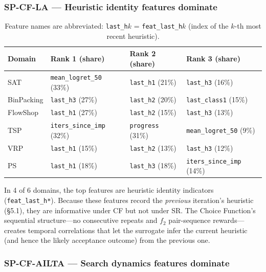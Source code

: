 \documentclass[11pt,a4paper]{article}
\begin{document}
\subsubsection*{SP-CF-LA --- Heuristic identity features dominate}

\begin{table}[H]
\centering
\small
\begin{tabular}{llll}
\toprule
Domain & Rank 1 (share) & Rank 2 (share) & Rank 3 (share) \\
\midrule
SAT & \texttt{mean\_logret\_50} (33\%) & \texttt{last\_h1} (21\%) & \texttt{last\_h3} (16\%) \\
BinPacking & \texttt{last\_h3} (27\%) & \texttt{last\_h2} (20\%) & \texttt{last\_class1} (15\%) \\
FlowShop & \texttt{last\_h1} (27\%) & \texttt{last\_h2} (15\%) & \texttt{last\_h3} (13\%) \\
TSP & \texttt{iters\_since\_imp} (32\%) & \texttt{progress} (31\%) & \texttt{mean\_logret\_50} (9\%) \\
VRP & \texttt{last\_h1} (15\%) & \texttt{last\_h2} (13\%) & \texttt{last\_h3} (12\%) \\
PS & \texttt{last\_h1} (18\%) & \texttt{last\_h3} (18\%) & \texttt{iters\_since\_imp} (14\%) \\
\bottomrule
\end{tabular}
\caption*{Feature names are abbreviated: \texttt{last\_h$k$} = \texttt{feat\_last\_h$k$}
(index of the $k$-th most recent heuristic).}
\end{table}

In 4 of 6 domains, the top features are heuristic identity indicators
(\texttt{feat\_last\_h*}). Because these features record the \emph{previous}
iteration's heuristic (\S5.1), they are informative under CF but not under
SR\@. The Choice Function's sequential structure---no consecutive
repeats and $f_2$ pair-sequence rewards---creates temporal correlations
that let the surrogate infer the current heuristic (and hence the
likely acceptance outcome) from the previous one.

\subsubsection*{SP-CF-AILTA --- Search dynamics features dominate}
\end{document}
